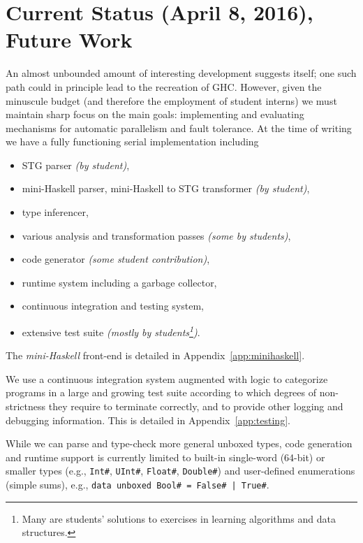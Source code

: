 \documentclass{llncs}
\begin{document}
\section{Current Status (April 8, 2016), Future Work}

An almost unbounded amount of interesting development suggests itself; one
such path could in principle lead to the recreation of GHC\@.  However, given
the minuscule budget (and therefore the employment of student interns) we must
maintain sharp focus on the main goals: implementing and evaluating mechanisms
for automatic parallelism and fault tolerance.  At the time of writing we have
a fully functioning serial implementation including
\begin{itemize}
\item STG parser \emph{(by student)},
\item mini-Haskell parser, mini-Haskell to STG transformer \emph{(by student)},
\item type inferencer,
\item various analysis and transformation passes \emph{(some by students)},
\item code generator \emph{(some student contribution)},
\item runtime system including a garbage collector,
\item continuous integration and testing system,
\item extensive test suite \emph{(mostly by students\footnote{Many are
    students' solutions to exercises in learning algorithms and data
    structures.})}.
\end{itemize}

The \emph{mini-Haskell} front-end is detailed in Appendix~\ref{app:minihaskell}.

We use a continuous integration system augmented with logic to categorize
programs in a large and growing test suite according to which degrees of
non-strictness they require to terminate correctly, and to provide other
logging and debugging information.  This is detailed in Appendix~\ref{app:testing}.

While we can parse and type-check more general unboxed types, code generation
and runtime support is currently limited to built-in single-word (64-bit) or
smaller types (e.g., \texttt{Int\#}, \texttt{UInt\#}, \texttt{Float\#},
\texttt{Double\#}) and user-defined enumerations (simple sums), e.g.,
\texttt{data unboxed Bool\# = False\# | True\#}.
\end{document}
